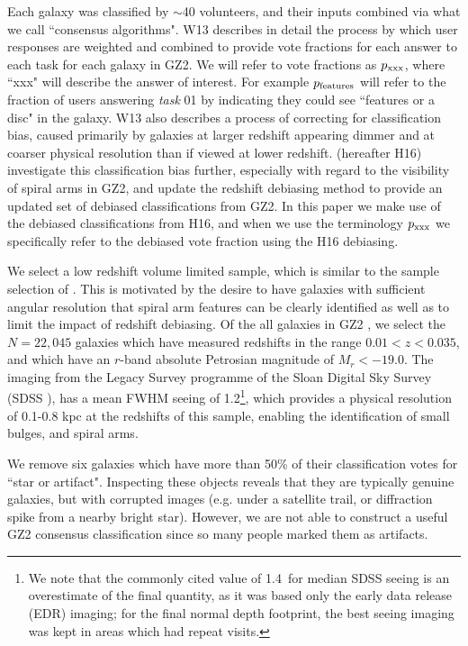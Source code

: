 \documentclass[usenatbib]{mn2e}
\begin{document}
Each galaxy was classified by $\sim$40 volunteers, and their inputs combined via what we call ``consensus algorithms". W13 describes in detail the process by which user responses are weighted and combined to provide vote fractions for each answer to each task for each galaxy in GZ2. We will refer to vote fractions as $p_{\rm xxx}$, where ``xxx" will describe the answer of interest. For example $p_{\rm features}$ will refer to the fraction of users answering {\it task} 01 by indicating they could see ``features or a disc" in the galaxy. W13 also describes a process of correcting for classification bias, caused primarily by galaxies at larger redshift appearing dimmer and at coarser physical resolution than if viewed at lower redshift. \citet{Hart2016} (hereafter H16) investigate this classification bias further, especially with regard to the visibility of spiral arms in GZ2, and update the redshift debiasing method to provide an updated set of debiased classifications from GZ2. In this paper we make use of the debiased classifications from H16, and when we use the terminology $p_{\rm xxx}$ we specifically refer to the debiased vote fraction using the H16 debiasing.

We select a low redshift volume limited sample, which is similar to the sample selection of \citet{Hart2016, Hart2017}. This is motivated by the desire to have galaxies with sufficient angular resolution that spiral arm features can be clearly identified as well as to limit the impact of redshift debiasing.  Of the all galaxies in GZ2 \citep{DR7,Strauss2002}, we select the $N=22,045$  galaxies which have measured redshifts in the range $0.01<z<0.035$, and which have an $r$-band absolute Petrosian magnitude of $M_r < -19.0$. The imaging from the Legacy Survey programme of the Sloan Digital Sky Survey (SDSS \citealt{York2000}), has a mean FWHM seeing of 1.2\arcsec \citep{Kruk2018}\footnote{We note that the commonly cited value of 1.4\arcsec ~for median SDSS seeing is an overestimate of the final quantity, as it was based only the early data release (EDR) imaging; for the final normal depth footprint, the best seeing imaging was kept in areas which had repeat visits.}, which provides a physical resolution of 0.1-0.8 kpc at the redshifts of this sample, enabling the identification of small bulges, and spiral arms. 

 We remove {six} galaxies which have more than 50\% of their classification votes for ``star or artifact". Inspecting these objects reveals that they are typically genuine galaxies, but with corrupted images (e.g. under a satellite trail, or diffraction spike from a nearby bright star). However, we are not able to construct a useful GZ2 consensus classification since so many people marked them as artifacts.
\end{document}
